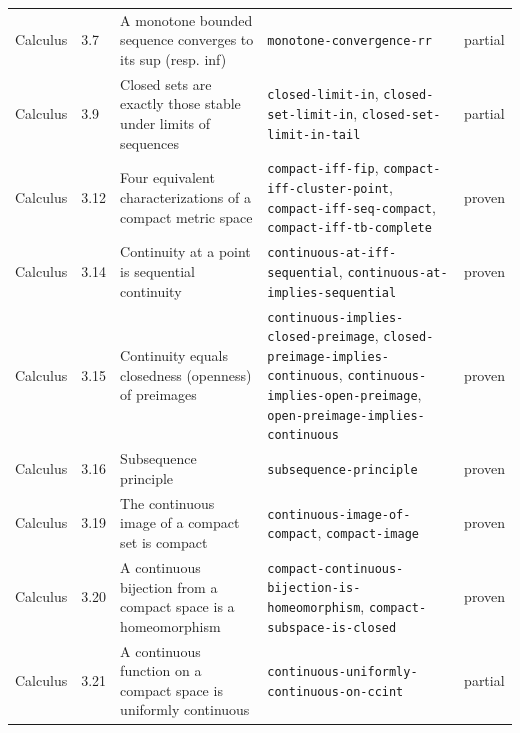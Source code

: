 \begin{longtable}{@{}ll>{\raggedright\arraybackslash}p{4.2cm}>{\raggedright\arraybackslash}p{4.2cm}l@{}}
Calculus & 3.7 & A monotone bounded sequence converges to its sup (resp. inf) & \texttt{monotone-\allowbreak{}convergence-\allowbreak{}rr} & partial \\
Calculus & 3.9 & Closed sets are exactly those stable under limits of sequences & \texttt{closed-\allowbreak{}limit-\allowbreak{}in}, \texttt{closed-\allowbreak{}set-\allowbreak{}limit-\allowbreak{}in}, \texttt{closed-\allowbreak{}set-\allowbreak{}limit-\allowbreak{}in-\allowbreak{}tail} & partial \\
Calculus & 3.12 & Four equivalent characterizations of a compact metric space & \texttt{compact-\allowbreak{}iff-\allowbreak{}fip}, \texttt{compact-\allowbreak{}iff-\allowbreak{}cluster-\allowbreak{}point}, \texttt{compact-\allowbreak{}iff-\allowbreak{}seq-\allowbreak{}compact}, \texttt{compact-\allowbreak{}iff-\allowbreak{}tb-\allowbreak{}complete} & proven \\
Calculus & 3.14 & Continuity at a point is sequential continuity & \texttt{continuous-\allowbreak{}at-\allowbreak{}iff-\allowbreak{}sequential}, \texttt{continuous-\allowbreak{}at-\allowbreak{}implies-\allowbreak{}sequential} & proven \\
Calculus & 3.15 & Continuity equals closedness (openness) of preimages & \texttt{continuous-\allowbreak{}implies-\allowbreak{}closed-\allowbreak{}preimage}, \texttt{closed-\allowbreak{}preimage-\allowbreak{}implies-\allowbreak{}continuous}, \texttt{continuous-\allowbreak{}implies-\allowbreak{}open-\allowbreak{}preimage}, \texttt{open-\allowbreak{}preimage-\allowbreak{}implies-\allowbreak{}continuous} & proven \\
Calculus & 3.16 & Subsequence principle & \texttt{subsequence-\allowbreak{}principle} & proven \\
Calculus & 3.19 & The continuous image of a compact set is compact & \texttt{continuous-\allowbreak{}image-\allowbreak{}of-\allowbreak{}compact}, \texttt{compact-\allowbreak{}image} & proven \\
Calculus & 3.20 & A continuous bijection from a compact space is a homeomorphism & \texttt{compact-\allowbreak{}continuous-\allowbreak{}bijection-\allowbreak{}is-\allowbreak{}homeomorphism}, \texttt{compact-\allowbreak{}subspace-\allowbreak{}is-\allowbreak{}closed} & proven \\
Calculus & 3.21 & A continuous function on a compact space is uniformly continuous & \texttt{continuous-\allowbreak{}uniformly-\allowbreak{}continuous-\allowbreak{}on-\allowbreak{}ccint} & partial \\

\end{longtable}
